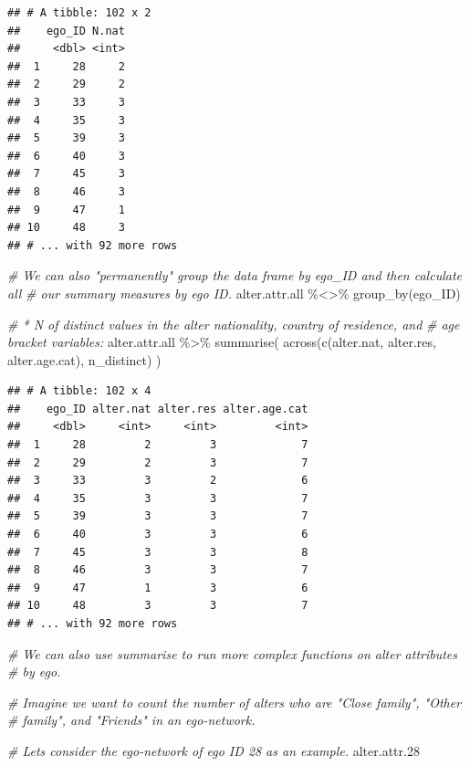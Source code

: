 \documentclass[
]{book}
\newenvironment{Shaded}{\begin{snugshade}}{\end{snugshade}}
\newcommand{\CommentTok}[1]{\textcolor[rgb]{0.56,0.35,0.01}{\textit{#1}}}
\newcommand{\FloatTok}[1]{\textcolor[rgb]{0.00,0.00,0.81}{#1}}
\newcommand{\FunctionTok}[1]{\textcolor[rgb]{0.00,0.00,0.00}{#1}}
\newcommand{\NormalTok}[1]{#1}
\newcommand{\SpecialCharTok}[1]{\textcolor[rgb]{0.00,0.00,0.00}{#1}}
\begin{document}
\begin{verbatim}
## # A tibble: 102 x 2
##    ego_ID N.nat
##     <dbl> <int>
##  1     28     2
##  2     29     2
##  3     33     3
##  4     35     3
##  5     39     3
##  6     40     3
##  7     45     3
##  8     46     3
##  9     47     1
## 10     48     3
## # ... with 92 more rows
\end{verbatim}

\begin{Shaded}
\begin{Highlighting}[]
\CommentTok{\# We can also "permanently" group the data frame by ego\_ID and then calculate all}
\CommentTok{\# our summary measures by ego ID.}
\NormalTok{alter.attr.all }\SpecialCharTok{\%\textless{}\textgreater{}\%} 
  \FunctionTok{group\_by}\NormalTok{(ego\_ID)}

\CommentTok{\# * N of distinct values in the alter nationality, country of residence, and}
\CommentTok{\# age bracket variables:}
\NormalTok{alter.attr.all }\SpecialCharTok{\%\textgreater{}\%}
  \FunctionTok{summarise}\NormalTok{(}
    \FunctionTok{across}\NormalTok{(}\FunctionTok{c}\NormalTok{(alter.nat, alter.res, alter.age.cat), }
\NormalTok{           n\_distinct)}
\NormalTok{    )}
\end{Highlighting}
\end{Shaded}

\begin{verbatim}
## # A tibble: 102 x 4
##    ego_ID alter.nat alter.res alter.age.cat
##     <dbl>     <int>     <int>         <int>
##  1     28         2         3             7
##  2     29         2         3             7
##  3     33         3         2             6
##  4     35         3         3             7
##  5     39         3         3             7
##  6     40         3         3             6
##  7     45         3         3             8
##  8     46         3         3             7
##  9     47         1         3             6
## 10     48         3         3             7
## # ... with 92 more rows
\end{verbatim}

\begin{Shaded}
\begin{Highlighting}[]
\CommentTok{\# We can also use summarise to run more complex functions on alter attributes}
\CommentTok{\# by ego.}

\CommentTok{\# Imagine we want to count the number of alters who are "Close family", "Other}
\CommentTok{\# family", and "Friends" in an ego{-}network.}

\CommentTok{\# Let\textquotesingle{}s consider the ego{-}network of ego ID 28 as an example.}
\NormalTok{alter.attr}\FloatTok{.28}
\end{Highlighting}
\end{Shaded}
\end{document}

